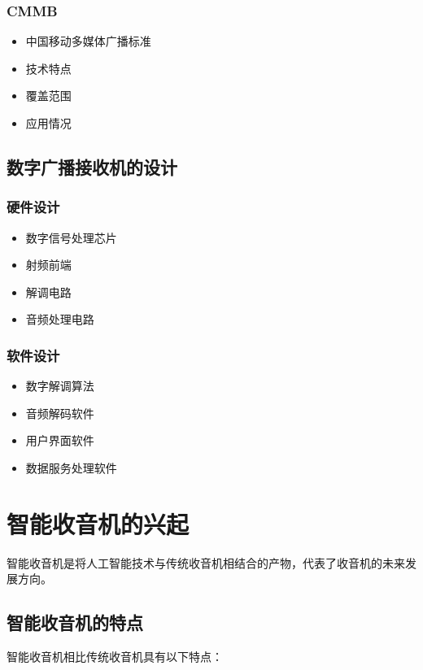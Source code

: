 \documentclass[12pt,UTF8]{ctexbook}
\begin{document}
\subsection{CMMB}\begin{itemize}
  \item 中国移动多媒体广播标准
  \item 技术特点
  \item 覆盖范围
  \item 应用情况\end{itemize}

\section{数字广播接收机的设计}

\subsection{硬件设计}\begin{itemize}
  \item 数字信号处理芯片
  \item 射频前端
  \item 解调电路
  \item 音频处理电路\end{itemize}

\subsection{软件设计}\begin{itemize}
  \item 数字解调算法
  \item 音频解码软件
  \item 用户界面软件
  \item 数据服务处理软件\end{itemize}

\chapter{智能收音机的兴起}

智能收音机是将人工智能技术与传统收音机相结合的产物，代表了收音机的未来发展方向。

\section{智能收音机的特点}

智能收音机相比传统收音机具有以下特点：
\end{document}
